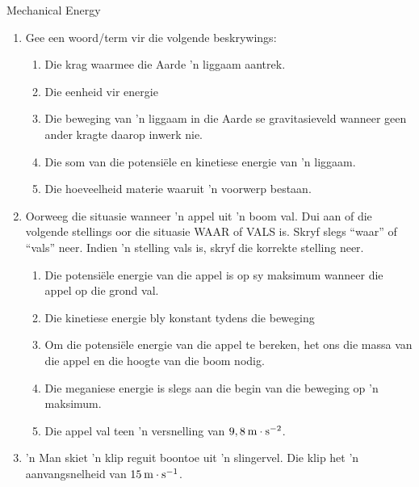 \begin{eocexercises}{Mechanical Energy}
            \nopagebreak
      \label{m38786*id71520}\begin{enumerate}[noitemsep, label=\textbf{\arabic*}. ] 
            \label{m38786*uid118}\item Gee een woord/term vir die volgende beskrywings:
\label{m38786*id71536}\begin{enumerate}[noitemsep, label=\textbf{\alph*}. ] 
            \label{m38786*uid119}\item Die krag waarmee die Aarde  'n liggaam aantrek.
\label{m38786*uid120}\item Die eenheid vir energie
\label{m38786*uid121}\item Die beweging van  'n liggaam in die Aarde se gravitasieveld wanneer geen ander kragte daarop inwerk nie.
\label{m38786*uid122}\item Die som van die potensiële en kinetiese energie van  'n liggaam.
\label{m38786*uid123}\item Die hoeveelheid materie waaruit  'n voorwerp bestaan.
\end{enumerate}
                \label{m38786*uid124}\item Oorweeg die situasie wanneer  'n appel uit  'n boom val. Dui aan of die volgende stellings oor die situasie WAAR of VALS is. Skryf slegs “waar” of “vals” neer. Indien  'n stelling vals is, skryf die korrekte stelling neer.
\label{m38786*id71616}\begin{enumerate}[noitemsep, label=\textbf{\alph*}. ] 
            \label{m38786*uid125}\item Die potensiële energie van die appel is op sy maksimum wanneer die appel op die grond val.
\label{m38786*uid126}\item Die kinetiese energie bly konstant tydens die beweging
\label{m38786*uid127}\item Om die potensiële energie van die appel te bereken, het ons die massa van die appel en die hoogte van die boom nodig.
\label{m38786*uid128}\item Die meganiese energie is slegs aan die begin van die beweging op  'n maksimum.
\label{m38786*uid129}\item Die appel val teen  'n versnelling van $9,8\phantom{\rule{2pt}{0ex}}\text{m}\ensuremath{\cdot}\text{s}{}^{-2}$.
\end{enumerate}
                \label{m38786*uid131}\item  'n Man skiet  'n klip reguit boontoe uit  'n slingervel. Die klip het  'n aanvangsnelheid van  $15\phantom{\rule{2pt}{0ex}}\text{m}\ensuremath{\cdot}\text{s}{}^{-1}$.

\end{enumerate}
\end{eocexercises}
